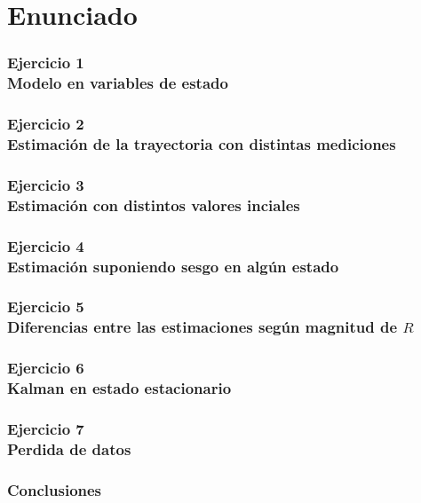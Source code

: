 \documentclass[10pt,a4paper]{article}
\begin{document}
		
	\setcounter{page}{1}

	\part{Enunciado}\label{sec:enunciado}
		

	\section{Ejercicio 1 \\ Modelo en variables de estado}\label{sec:ej1}
		
		
	\section{Ejercicio 2 \\ Estimación de la trayectoria con distintas mediciones}\label{sec:ej2}
		

	\section{Ejercicio 3 \\ Estimación con distintos valores inciales}\label{sec:ej3}
		

	\section{Ejercicio 4 \\ Estimación suponiendo sesgo en algún estado}\label{sec:ej4}
		

	\section{Ejercicio 5 \\ Diferencias entre las estimaciones según magnitud de $R$}\label{sec:ej5}
		

	\section{Ejercicio 6 \\ Kalman en estado estacionario}\label{sec:ej6}
		

	\section{Ejercicio 7 \\ Perdida de datos}\label{sec:ej7}
		

	\section{Conclusiones}\label{sec:conclusiones}
		

\end{document}
